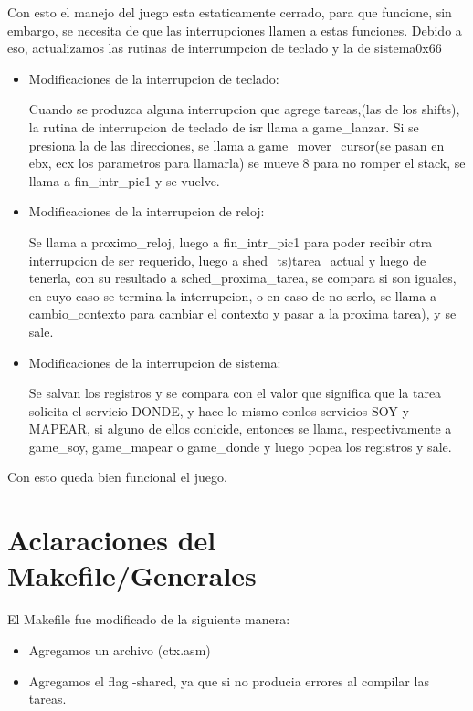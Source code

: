 \documentclass[a4paper]{article}
\begin{document}
Con esto el manejo del juego esta estaticamente cerrado, para que funcione, sin embargo, se necesita de que las interrupciones llamen a estas funciones. Debido a eso, actualizamos las rutinas de interrumpcion de teclado y la de sistema0x66

\begin{itemize}


\item{Modificaciones de la interrupcion de teclado:}

Cuando se produzca alguna interrupcion que agrege tareas,(las de los shifts), 
la rutina de interrupcion de teclado de isr llama a game_lanzar. Si se presiona la de las direcciones, se llama a game_mover_cursor(se pasan en ebx, ecx los parametros para llamarla) se mueve 8 para no romper el stack, se llama a fin_intr_pic1 y se vuelve.

\item{Modificaciones de la interrupcion de reloj:}

Se llama a proximo_reloj, luego a fin_intr_pic1  para poder recibir otra interrupcion de ser requerido, luego a shed_ts)tarea_actual y luego de tenerla, con su resultado a sched_proxima_tarea, se compara si son iguales, en cuyo caso se termina la interrupcion, o en caso de no serlo, se llama a cambio_contexto para cambiar el contexto y pasar a la proxima tarea),  y se sale.

\item{Modificaciones de la interrupcion de sistema:}

Se salvan los registros y se  compara con el valor que significa que la tarea solicita el servicio DONDE, y hace lo mismo conlos servicios SOY y MAPEAR, si alguno de ellos conicide, entonces se llama, respectivamente a game_soy, game_mapear o game_donde y luego popea los registros y sale. 

\end{itemize}



Con esto queda bien funcional el juego.



\section{Aclaraciones del Makefile/Generales}

El Makefile fue modificado  de la siguiente manera:
\begin{itemize}

 \item{Agregamos un archivo (ctx.asm)}
 
 \item{Agregamos  el flag -shared, ya que si no producia errores al compilar las tareas.}
 
 \end{itemize}
\end{document}
